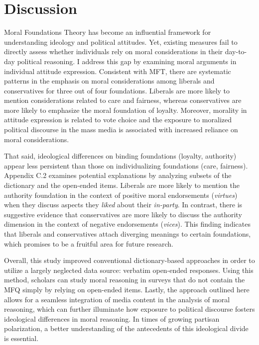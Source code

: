 \section{Discussion}

Moral Foundations Theory has become an influential framework for understanding ideology and political attitudes. Yet, existing measures fail to directly assess whether individuals rely on moral considerations in their day-to-day political reasoning. I address this gap by examining moral arguments in individual attitude expression. Consistent with MFT, there are systematic patterns in the emphasis on moral considerations among liberals and conservatives for three out of four foundations. Liberals are more likely to mention considerations related to care and fairness, whereas conservatives are more likely to emphasize the moral foundation of loyalty. Moreover, morality in attitude expression is related to vote choice and the exposure to moralized political discourse in the mass media is associated with increased reliance on moral considerations.

That said, ideological differences on binding foundations (loyalty, authority) appear less persistent than those on individualizing foundations (care, fairness). Appendix C.2 examines potential explanations by analyzing subsets of the dictionary and the open-ended items. Liberals are more likely to mention the authority foundation in the context of positive moral endorsements (\textit{virtues}) when they discuss aspects they \textit{liked} about their \textit{in-party}. In contrast, there is suggestive evidence that conservatives are more likely to discuss the authority dimension in the context of negative endorsements (\textit{vices}). This finding indicates that liberals and conservatives attach diverging meanings to certain foundations, which promises to be a fruitful area for future research.

Overall, this study improved conventional dictionary-based approaches in order to utilize a largely neglected data source: verbatim open-ended responses. Using this method, scholars can study moral reasoning in surveys that do not contain the MFQ simply by relying on open-ended items. Lastly, the approach outlined here allows for a seamless integration of media content in the analysis of moral reasoning, which can further illuminate how exposure to political discourse fosters ideological differences in moral reasoning. In times of growing partisan polarization, a better understanding of the antecedents of this ideological divide is essential.
